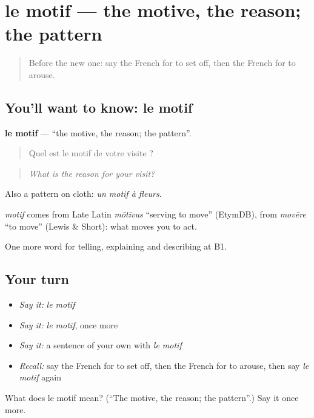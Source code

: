 \section[le motif]{le motif — the motive, the reason; the pattern}

\label{lesson:FR-C350-motif}



\begin{quote}
Before the new one: say the French for to set off, then the French for to arouse.
\end{quote}

\subsection*{You'll want to know: le motif}
\textbf{le motif} — \textquotedblleft{}the motive, the reason; the pattern\textquotedblright{}.

\begin{quote}
Quel est le motif de votre visite ?
\end{quote}

\begin{quote}
\emph{What is the reason for your visit?}
\end{quote}

Also a pattern on cloth: \emph{un motif à fleurs}.

\begin{cousinweb}
\emph{motif} comes from Late Latin \emph{mōtīvus} \textquotedblleft{}serving to move\textquotedblright{} (EtymDB), from \emph{movēre} \textquotedblleft{}to move\textquotedblright{} (Lewis \& Short): what moves you to act.
\end{cousinweb}

\begin{grammarlens}[title={What you've built}]
One more word for telling, explaining and describing at B1.
\end{grammarlens}

\subsection*{Your turn}
\begin{itemize}
\raggedright
  \item \emph{Say it:} \emph{le motif}
  \item \emph{Say it:} \emph{le motif}, once more
  \item \emph{Say it:} a sentence of your own with \emph{le motif}
  \item \emph{Recall:} say the French for to set off, then the French for to arouse, then say \emph{le motif} again
\end{itemize}

\begin{tcolorbox}[breakable,colback=teal!4,colframe=teal!35!black,title={Before you move on}]
What does le motif mean? (\textquotedblleft{}The motive, the reason; the pattern\textquotedblright{}.) Say it once more.
\end{tcolorbox}
